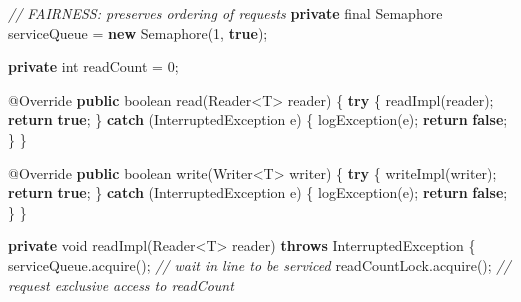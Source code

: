 \documentclass[11pt]{article}
\newenvironment{Shaded}{}{}
\newcommand{\KeywordTok}[1]{\textcolor[rgb]{0.00,0.44,0.13}{\textbf{{#1}}}}
\newcommand{\DataTypeTok}[1]{\textcolor[rgb]{0.56,0.13,0.00}{{#1}}}
\newcommand{\DecValTok}[1]{\textcolor[rgb]{0.25,0.63,0.44}{{#1}}}
\newcommand{\CommentTok}[1]{\textcolor[rgb]{0.38,0.63,0.69}{\textit{{#1}}}}
\newcommand{\FunctionTok}[1]{\textcolor[rgb]{0.02,0.16,0.49}{{#1}}}
\newcommand{\NormalTok}[1]{{#1}}
\newcommand{\ControlFlowTok}[1]{\textcolor[rgb]{0.00,0.44,0.13}{\textbf{{#1}}}}
\newcommand{\OperatorTok}[1]{\textcolor[rgb]{0.40,0.40,0.40}{{#1}}}
\newcommand{\BuiltInTok}[1]{{#1}}
\newcommand{\AttributeTok}[1]{\textcolor[rgb]{0.49,0.56,0.16}{{#1}}}
\begin{document}
\begin{Shaded}
\begin{Highlighting}[]
    \CommentTok{// FAIRNESS: preserves ordering of requests}
    \KeywordTok{private} \DataTypeTok{final} \BuiltInTok{Semaphore}\NormalTok{ serviceQueue }\OperatorTok{=} \KeywordTok{new} \BuiltInTok{Semaphore}\OperatorTok{(}\DecValTok{1}\OperatorTok{,} \KeywordTok{true}\OperatorTok{);}

    \KeywordTok{private} \DataTypeTok{int}\NormalTok{ readCount }\OperatorTok{=} \DecValTok{0}\OperatorTok{;}

    \AttributeTok{@Override}
    \KeywordTok{public} \DataTypeTok{boolean} \FunctionTok{read}\OperatorTok{(}\BuiltInTok{Reader}\OperatorTok{\textless{}}\NormalTok{T}\OperatorTok{\textgreater{}}\NormalTok{ reader}\OperatorTok{)} \OperatorTok{\{}
        \ControlFlowTok{try} \OperatorTok{\{}
            \FunctionTok{readImpl}\OperatorTok{(}\NormalTok{reader}\OperatorTok{);}
            \ControlFlowTok{return} \KeywordTok{true}\OperatorTok{;}
        \OperatorTok{\}} \ControlFlowTok{catch} \OperatorTok{(}\BuiltInTok{InterruptedException}\NormalTok{ e}\OperatorTok{)} \OperatorTok{\{}
            \FunctionTok{logException}\OperatorTok{(}\NormalTok{e}\OperatorTok{);}
            \ControlFlowTok{return} \KeywordTok{false}\OperatorTok{;}
        \OperatorTok{\}}
    \OperatorTok{\}}

    \AttributeTok{@Override}
    \KeywordTok{public} \DataTypeTok{boolean} \FunctionTok{write}\OperatorTok{(}\BuiltInTok{Writer}\OperatorTok{\textless{}}\NormalTok{T}\OperatorTok{\textgreater{}}\NormalTok{ writer}\OperatorTok{)} \OperatorTok{\{}
        \ControlFlowTok{try} \OperatorTok{\{}
            \FunctionTok{writeImpl}\OperatorTok{(}\NormalTok{writer}\OperatorTok{);}
            \ControlFlowTok{return} \KeywordTok{true}\OperatorTok{;}
        \OperatorTok{\}} \ControlFlowTok{catch} \OperatorTok{(}\BuiltInTok{InterruptedException}\NormalTok{ e}\OperatorTok{)} \OperatorTok{\{}
            \FunctionTok{logException}\OperatorTok{(}\NormalTok{e}\OperatorTok{);}
            \ControlFlowTok{return} \KeywordTok{false}\OperatorTok{;}
        \OperatorTok{\}}
    \OperatorTok{\}}

    \KeywordTok{private} \DataTypeTok{void} \FunctionTok{readImpl}\OperatorTok{(}\BuiltInTok{Reader}\OperatorTok{\textless{}}\NormalTok{T}\OperatorTok{\textgreater{}}\NormalTok{ reader}\OperatorTok{)} \KeywordTok{throws} \BuiltInTok{InterruptedException} \OperatorTok{\{}
\NormalTok{        serviceQueue}\OperatorTok{.}\FunctionTok{acquire}\OperatorTok{();}     \CommentTok{// wait in line to be serviced}
\NormalTok{        readCountLock}\OperatorTok{.}\FunctionTok{acquire}\OperatorTok{();}    \CommentTok{// request exclusive access to readCount}


\end{Highlighting}
\end{Shaded}
\end{document}
